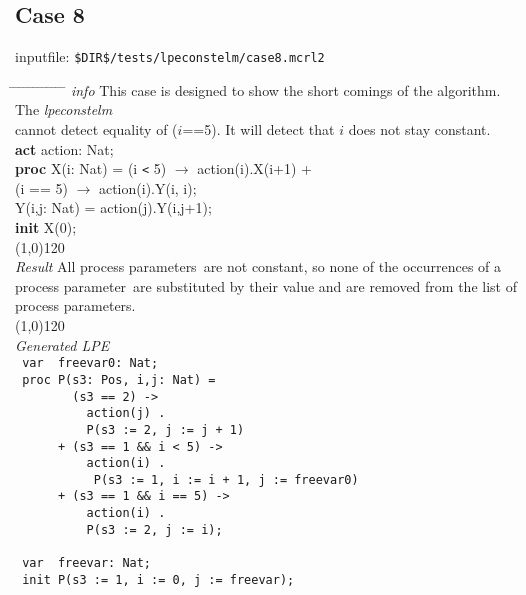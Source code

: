 \index{}\documentclass[a4paper,10pt]{article}
\theoremstyle{plain}
\theoremstyle{definition}
\newcommand{\tool}{\textit{lpeconstelm}}
\newcommand{\pp}{process parameter}
\newcommand{\pps}{process parameters}
\newcommand{\ti}{\textit}
\newcommand{\tb}{\textbf}
\newcommand{\tabw}{\hspace*{15.mm} \= \hspace*{20.mm} \= \hspace*{5.mm} \= \hspace*{5.mm} \= \hspace*{5.mm} \= \hspace*{5.mm}  \= \hspace*{5.mm}  \= \hspace*{5.mm}  \= \hspace*{5.mm} \= \hspace*{5.mm} \= \hspace*{5.mm}  \= \hspace*{5.mm}  \= \hspace*{5.mm}\kill}
\begin{document}
\subsection*{Case 8}
inputfile: \verb"$DIR$/tests/lpeconstelm/case8.mcrl2"
\begin{tabbing}
\tabw
\ti{info} \> This case is designed to show the short comings of the algorithm. The \tool \ \\
	\> cannot detect equality of ($i$==5). It will detect that $i$ does not stay constant. \\ 
\tb{act} \> action: Nat;\\
\tb{proc} \> X(i: Nat)   = \>  (i \verb"<"  5) $\rightarrow$ action(i).X(i+1) +\\
           \>        \> (i == 5) $\rightarrow$ action(i).Y(i, i);\\
    \>  Y(i,j: Nat) = \>  action(j).Y(i,j+1);               \\
\tb{init} X(0);\\
\line(1,0){120}\\
\ti{Result} \> All \pps\ are not constant, so none of the occurrences of a \\
\> \pp\ are substituted by their value and are removed from the list of \\
\> \pps.\\
\line(1,0){120}\\
\ti{Generated LPE} \\
\>  \verb" var  freevar0: Nat;"                              \\      %
\>  \verb" proc P(s3: Pos, i,j: Nat) = "                       \\    %
\>  \verb"        (s3 == 2) ->        "                        \\    %
\>  \verb"          action(j) .     "                          \\    %
\>  \verb"          P(s3 := 2, j := j + 1)"                    \\    %
\>  \verb"      + (s3 == 1 && i < 5) ->"                       \\    %
\>  \verb"          action(i) . "                              \\    %
\>  \verb"           P(s3 := 1, i := i + 1, j := freevar0) "   \\    %
\>  \verb"      + (s3 == 1 && i == 5) -> "                     \\    %
\>  \verb"          action(i) .       "                        \\    %
\>  \verb"          P(s3 := 2, j := i);"                       \\    %
\>  \verb"                            "                        \\    %
\>  \verb" var  freevar: Nat;      "                           \\    %
\>  \verb" init P(s3 := 1, i := 0, j := freevar);"             \\    %
\end{tabbing}
\end{document}
